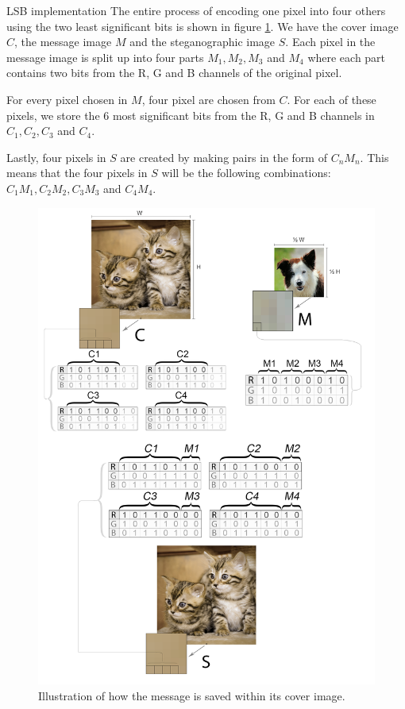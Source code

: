 \begin{experiment}{LSB implementation}
The entire process of encoding one pixel into four others using the two least significant bits is shown in figure \ref{fig:hundigrafik}. We have the cover image $C$, the message image $M$ and the steganographic image $S$. Each pixel in the message image is split up into four parts $M_1, M_2, M_3$ and $M_4$ where each part contains two bits from the R, G and B channels of the original pixel.

For every pixel chosen in $M$, four pixel are chosen from $C$. For each of these pixels, we store the 6 most significant bits from the R, G and B channels in $C_1, C_2, C_3$ and $C_4$.

Lastly, four pixels in $S$ are created by making pairs in the form of $C_nM_n$. This means that the four pixels in $S$ will be the following combinations: $C_1M_1,C_2M_2,C_3M_3$ and $C_4M_4$.

\end{experiment}
\begin{figure}
	\centering
	\includegraphics[width=1\textwidth]{figures/hundikatgrafik.png}
	\caption{Illustration of how the message is saved within its cover image.}
	\label{fig:hundigrafik}
\end{figure}




